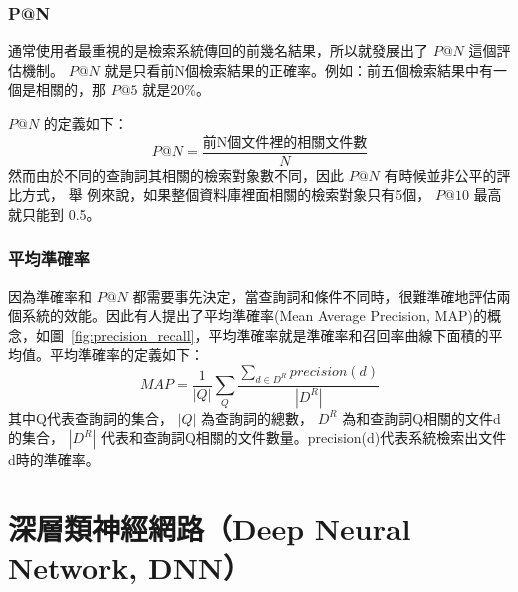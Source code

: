 \subsubsection{P@N}

通常使用者最重視的是檢索系統傳回的前幾名結果，所以就發展出了 $ P@N $ 這個評估機制。 $ P@N $ 就是只看前N個檢索結果的正確率。例如：前五個檢索結果中有一個是相關的，那 $ P@5 $ 就是20\%。

 $ P@N $ 的定義如下：
\[
P@N=\frac{\text{前N個文件裡的相關文件數}}{N}
\]
 然而由於不同的查詢詞其相關的檢索對象數不同，因此  $ P@N $  有時候並非公平的評比方式， 舉
 例來說，如果整個資料庫裡面相關的檢索對象只有5個，  $ P@10 $  最高就只能到
 0.5。
\subsubsection{平均準確率~\cite{garofolo2000trec}}

因為準確率和 $ P@N $ 都需要事先決定，當查詢詞和條件不同時，很難準確地評估兩個系統的效能。因此有人提出了平均準確率(Mean Average Precision, MAP)的概念，如圖~\ref{fig:precision_recall}，平均準確率就是準確率和召回率曲線下面積的平均值。平均準確率的定義如下：
\begin{equation}
MAP = \frac{1}{|Q|} \sum_Q \frac{\sum_{d \in D^R}precision(d)}{|D^R|}
\end{equation}
其中Q代表查詢詞的集合， $ |Q| $ 為查詢詞的總數， $ D^R $ 為和查詢詞Q相關的文件d的集合， $ |D^R| $ 代表和查詢詞Q相關的文件數量。precision(d)代表系統檢索出文件d時的準確率。



\vspace{10cm}
\section{深層類神經網路（Deep Neural Network, DNN）}
\label{DNN}
